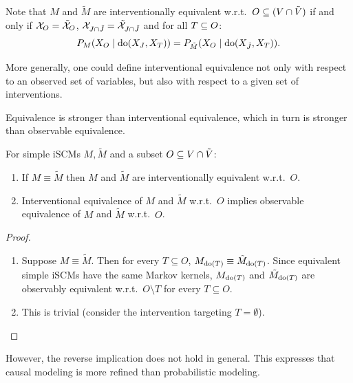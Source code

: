 \begin{Rem}\label{rem:scm_interv_equiv}
  Note that $M$ and $\tilde{M}$ are interventionally equivalent w.r.t.\ $O \subseteq (V \cap \tilde{V})$ if and only if
  $\mathcal{X}_O = \tilde{\mathcal{X}}_O$, $\mathcal{X}_{J \cap \tilde{J}} = \tilde{\mathcal{X}}_{J \cap \tilde{J}}$
  and for all $T \subseteq O$:
    $$P_{M}(X_O \mid \operatorname{do}(X_J,X_T)) = P_{\tilde{M}}(X_O \mid \operatorname{do}(X_{\tilde J},X_T)).$$
\end{Rem}
More generally, one could define interventional equivalence not only with respect to an observed set of variables, but also with respect to a given set of interventions.

Equivalence is stronger than interventional equivalence, which in turn is stronger than observable equivalence.
\begin{Prp}\label{prp:pearls_ladder_levels_1_and_2}
  For simple iSCMs $M, \tilde{M}$ and a subset $O \subseteq V \cap \tilde{V}$:
  \begin{enumerate}
    \item If $M \equiv \tilde{M}$ then $M$ and $\tilde{M}$ are interventionally equivalent w.r.t.\ $O$.
    \item Interventional equivalence of $M$ and $\tilde{M}$ w.r.t.\ $O$ implies observable equivalence of $M$ and $\tilde{M}$ w.r.t.\ $O$.
  \end{enumerate}
\end{Prp}
\begin{proof}
  \begin{enumerate}
   \item
   Suppose $M \equiv \tilde{M}$. 
   Then for every $T \subseteq O$, $M_{\operatorname{do}(T)} \equiv \tilde{M}_{\operatorname{do}(T)}$.
   Since equivalent simple iSCMs have the same Markov kernels, $M_{\operatorname{do}(T)}$ and $\tilde{M}_{\operatorname{do}(T)}$ are observably equivalent w.r.t.\ $O \setminus T$ for every $T \subseteq O$.

  \item This is trivial (consider the intervention targeting $T = \emptyset$).
\end{enumerate}
\end{proof}
However, the reverse implication does not hold in general. This expresses that causal modeling is more refined than probabilistic modeling.
